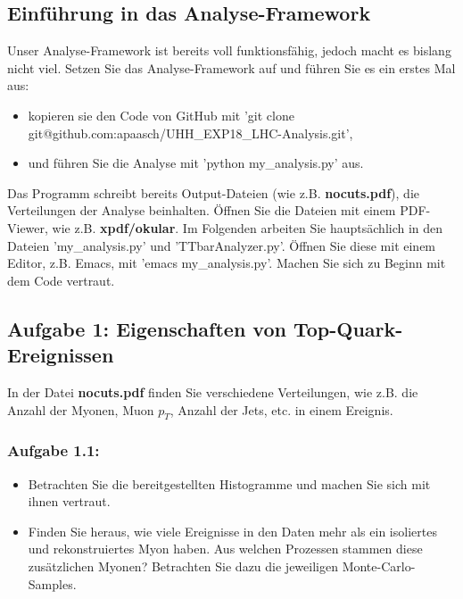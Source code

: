 \subsection{Einf\"uhrung in das Analyse-Framework}
Unser Analyse-Framework ist bereits voll funktionsf\"ahig, jedoch macht es bislang nicht viel. Setzen Sie das Analyse-Framework auf und f\"uhren Sie es ein erstes Mal aus:
\begin{itemize}
	\item kopieren sie den Code von GitHub mit 'git clone git@github.com:apaasch/UHH\_EXP18\_LHC-Analysis.git',
	\item und führen Sie die Analyse mit 'python my\_analysis.py' aus.
\end{itemize}
Das Programm schreibt bereits Output-Dateien (wie z.B. \textbf{nocuts.pdf}), die Verteilungen der Analyse beinhalten. \"Offnen Sie die Dateien mit einem PDF-Viewer, wie z.B. \textbf{xpdf/okular}. Im Folgenden arbeiten Sie haupts\"achlich in den Dateien 'my\_analysis.py' und 'TTbarAnalyzer.py'. \"Offnen Sie diese mit einem Editor, z.B. Emacs, mit 'emacs my\_analysis.py'. Machen Sie sich zu Beginn mit dem Code vertraut.

\subsection{Aufgabe 1: Eigenschaften von Top-Quark-Ereignissen}
In der Datei \textbf{nocuts.pdf} finden Sie verschiedene Verteilungen, wie z.B. die Anzahl der Myonen, Muon $p_{T}$, Anzahl der Jets, etc. in einem Ereignis. \\
\subsubsection{Aufgabe 1.1:}
\begin{itemize}
  \item Betrachten Sie die bereitgestellten Histogramme und machen Sie sich mit ihnen vertraut.
  \item Finden Sie heraus, wie viele Ereignisse in den Daten mehr als ein isoliertes und rekonstruiertes Myon haben. Aus welchen Prozessen stammen diese zus\"atzlichen Myonen? Betrachten Sie dazu die jeweiligen Monte-Carlo-Samples.
\end{itemize}

